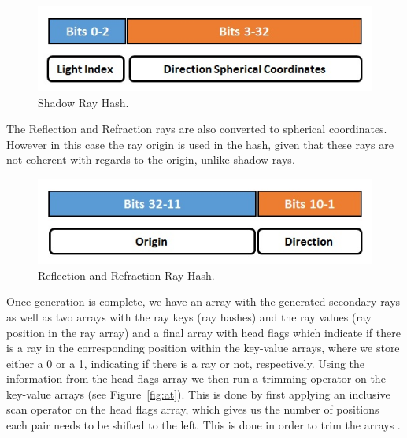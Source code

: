 \documentclass{egpubl}
\begin{document}
\begin{figure}[!htb]
    \centering
    \includegraphics[scale=0.50]{Images/Shadow_Hash.jpg}
    \caption{\label{fig:sr}Shadow Ray Hash.}
\end{figure}

The Reflection and Refraction rays are also converted to spherical coordinates. However in this case the ray origin is used in the hash, given that these rays are not coherent with regards to the origin, unlike shadow rays.

\begin{figure}[!htb]
    \centering
    \includegraphics[scale=0.50]{Images/Reflection_Hash.jpg}
    \caption{\label{fig:rr}Reflection and Refraction Ray Hash.}
\end{figure}

Once generation is complete, we have an array with the generated secondary rays as well as two arrays with the ray keys (ray hashes) and the ray values (ray position in the ray array) and a final array with head flags which indicate if there is a ray in the corresponding position within the key-value arrays, where we store either a 0 or a 1, indicating if there is a ray or not, respectively.
Using the information from the head flags array we then run a trimming operator on the key-value arrays (see Figure~\ref{fig:at}). This is done by first applying an inclusive scan operator \cite{Merrill09} on the head flags array, which gives us the number of positions each pair needs to be shifted to the left. This is done in order to trim the arrays \cite{GPUGems2}.
\end{document}
